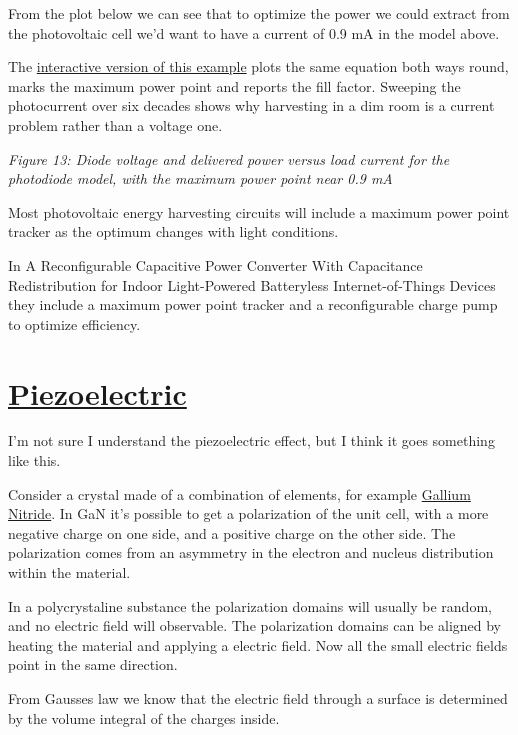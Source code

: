 From the plot below we can see that to optimize the power we could
extract from the photovoltaic cell we'd want to have a current of 0.9 mA
in the model above.

The
\href{https://wulffern.github.io/aic2026/assets/examples/pv.html}{interactive
version of this example} plots the same equation both ways round, marks
the maximum power point and reports the fill factor. Sweeping the
photocurrent over six decades shows why harvesting in a dim room is a
current problem rather than a voltage one.


{
\centering
{}
}

\emph{Figure 13: Diode voltage and delivered power versus load current
for the photodiode model, with the maximum power point near 0.9 mA}

Most photovoltaic energy harvesting circuits will include a maximum
power point tracker as the optimum changes with light conditions.

In A Reconfigurable Capacitive Power Converter With Capacitance
Redistribution for Indoor Light-Powered Batteryless Internet-of-Things
Devices  they include a maximum power
point tracker and a reconfigurable charge pump to optimize efficiency.

\section{\texorpdfstring{\href{https://en.wikipedia.org/wiki/Piezoelectricity}{Piezoelectric}}{Piezoelectric}}\label{piezoelectric}

I'm not sure I understand the piezoelectric effect, but I think it goes
something like this.

Consider a crystal made of a combination of elements, for example
\href{http://lampx.tugraz.at/~hadley/ss1/crystalstructure/structures/semiconductors/GaN.html}{Gallium
Nitride}. In GaN it's possible to get a polarization of the unit cell,
with a more negative charge on one side, and a positive charge on the
other side. The polarization comes from an asymmetry in the electron and
nucleus distribution within the material.

In a polycrystaline substance the polarization domains will usually be
random, and no electric field will observable. The polarization domains
can be aligned by heating the material and applying a electric field.
Now all the small electric fields point in the same direction.

From Gausses law we know that the electric field through a surface is
determined by the volume integral of the charges inside.

